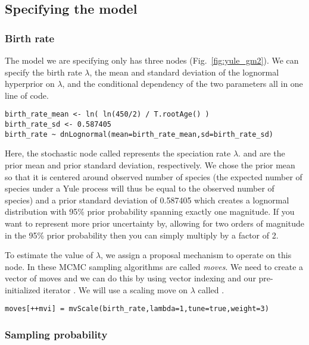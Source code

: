 \subsection{Specifying the model}

\subsubsection{Birth rate}

The model we are specifying only has three nodes (Fig.~\ref{fig:yule_gm2}). 
We can specify the birth rate $\lambda$, the mean and standard deviation of the lognormal hyperprior on $\lambda$, and the conditional dependency of the two parameters all in one line of \Rev code.
{\tt \begin{snugshade*}
\begin{lstlisting}
birth_rate_mean <- ln( ln(450/2) / T.rootAge() )
birth_rate_sd <- 0.587405
birth_rate ~ dnLognormal(mean=birth_rate_mean,sd=birth_rate_sd) 
\end{lstlisting}
\end{snugshade*}}
Here, the stochastic node called  represents the speciation rate $\lambda$.
 and  are the prior mean and prior standard deviation, respectively.
We chose the prior mean so that it is centered around observed number of species (\IE the expected number of species under a Yule process will thus be equal to the observed number of species) and a prior standard deviation of 0.587405 which creates a lognormal distribution with 95\% prior probability spanning exactly one magnitude.
If you want to represent more prior uncertainty by, \EG allowing for two orders of magnitude in the 95\% prior probability then you can simply multiply  by a factor of 2.

To estimate the value of $\lambda$, we assign a proposal mechanism to operate on this node. 
In \RevBayes these MCMC sampling algorithms are called \emph{moves}. 
We need to create a vector of moves and we can do this by using vector indexing and our pre-initialized iterator .
We will use a scaling move on $\lambda$ called .
{\tt \begin{snugshade*}
\begin{lstlisting}
moves[++mvi] = mvScale(birth_rate,lambda=1,tune=true,weight=3)
\end{lstlisting}
\end{snugshade*}}

\subsubsection{Sampling probability}


